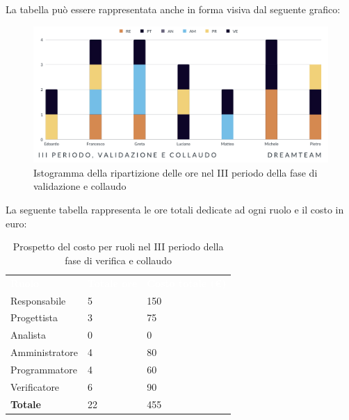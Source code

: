 La tabella può essere rappresentata anche in forma visiva dal seguente grafico:
\begin{figure}[!h]
\centering
\includegraphics[scale=0.65]{Sezioni/SezioniPreventivo/grafici/Validazione_collaudo_III_periodo.png}
\caption{Istogramma della ripartizione delle ore nel III periodo della fase di validazione e collaudo}
\end{figure}

La seguente tabella rappresenta le ore totali dedicate ad ogni ruolo e il costo in euro:

\begin{table}[!htbp]
\begin{center}
\renewcommand{\arraystretch}{1.5}
\begin{tabular}{ m{}<{\centering}  m{}<{\centering} m{}<{\centering}}
	\rowcolor{darkblue}
	\textcolor{white}{\textbf{Ruolo}}&\textcolor{white}{\textbf{Totale ore}}&\textcolor{white}{\textbf{Costo totale (\euro)}}\\ 

	Responsabile  & 5 & 150 \\	
	
	Progettista & 3 & 75 \\
	
	Analista & 0 & 0 \\

	Amministratore & 4 & 80 \\
	
	Programmatore & 4 & 60 \\
	
	Verificatore & 6 & 90 \\
	
	\textbf{Totale} & 22 & 455 \\
	
\end{tabular}
\caption{Prospetto del costo per ruoli nel III periodo della fase di verifica e collaudo}
\end{center}
\end{table}

